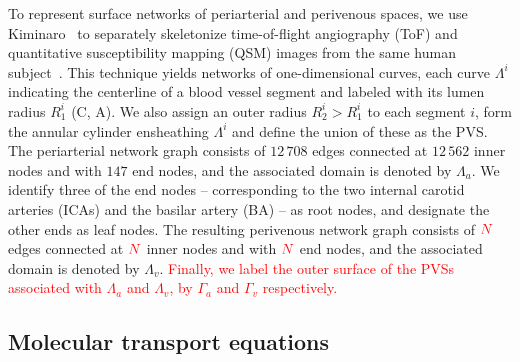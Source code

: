 \documentclass[fleqn,10pt]{wlscirep}
\newcommand{\discuss}[1]{\textcolor{red}{#1}}
\newcommand{\fixme}[1]{\textcolor{red}{#1}}
\begin{document}
To represent surface networks of periarterial and perivenous spaces,
we use Kiminaro~\cite{william_silversmith_2021_5539913} to separately
skeletonize time-of-flight angiography (ToF) and quantitative
susceptibility mapping (QSM) images from the same human
subject~\cite{hodneland2019new}. This technique yields networks of
one-dimensional curves, each curve $\Lambda^i$ indicating the
centerline of a blood vessel segment and labeled with its lumen radius
$R_1^i$ (C, A). We also assign an
outer radius $R_2^i > R_1^i$ to each segment $i$, form the annular
cylinder ensheathing $\Lambda^i$ and define the union of these as the
PVS. The periarterial network graph consists of $12\,708$ edges
connected at $12\,562$ inner nodes and with $147$ end nodes, and the
associated domain is denoted by $\Lambda_a$. We identify three of the
end nodes -- corresponding to the two internal carotid arteries (ICAs)
and the basilar artery (BA) -- as root nodes, and designate the other
ends as leaf nodes. The resulting perivenous network graph consists of
$\fixme{N}$ edges connected at $\fixme{N}$ inner nodes and with
$\fixme{N}$ end nodes, and the associated domain is denoted by
$\Lambda_v$. \discuss{Finally, we label the outer surface of the PVSs
  associated with $\Lambda_a$ and $\Lambda_v$, by $\Gamma_a$ and
  $\Gamma_v$ respectively.}


\subsection*{Molecular transport equations}
\end{document}
